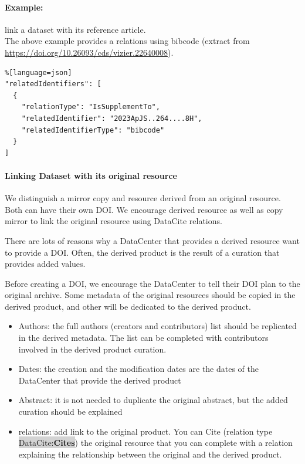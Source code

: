 \documentclass[11pt,a4paper]{ivoa}
\newcommand{\dataciteterm}[1]{\colorbox{lightgray}{DataCite:\textbf{#1}}}
\begin{document}


\paragraph{Example:} link a dataset with its reference article.\\
The above example provides a relations using bibcode (extract from \url{https://doi.org/10.26093/cds/vizier.22640008}).

\begin{lstlisting}%[language=json]
"relatedIdentifiers": [
  {
    "relationType": "IsSupplementTo",
    "relatedIdentifier": "2023ApJS..264....8H",
    "relatedIdentifierType": "bibcode"
  }
]
\end{lstlisting}

\paragraph{Linking Dataset with its original resource}
We distinguish a mirror copy and resource derived from an original resource.
Both can have their own DOI. We encourage derived resource as well as copy mirror to link the original resource using DataCite relations.

There are lots of reasons why a DataCenter that provides a derived resource want to provide a DOI. 
Often, the derived product is the result of a curation that provides added values.

Before creating a DOI, we encourage the DataCenter to tell their DOI plan to the original archive.
Some metadata of the original resources should be copied in the derived product, and other will be dedicated to the derived product.

\begin{itemize}
\item Authors: the full authors (creators and contributors) list should be replicated in the derived metadata. The list can be completed with contributors involved in the derived product curation.
\item Dates: the creation and the modification dates are the dates of the DataCenter that provide the derived product
\item Abstract: it is not needed to duplicate the original abstract, but the added curation should be explained
\item relations: add link to the original product. 
You can Cite (relation type \dataciteterm{Cites}) the original resource that you can complete with a relation explaining the relationship between the original and the derived product.
\end{itemize}
\end{document}
